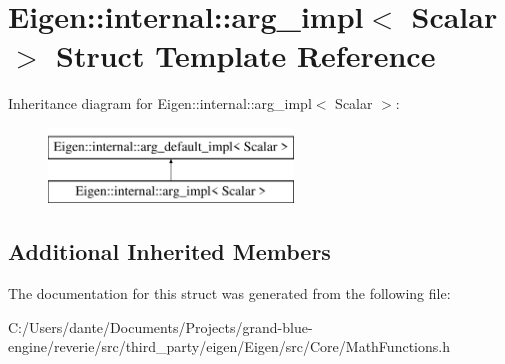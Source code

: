 \hypertarget{struct_eigen_1_1internal_1_1arg__impl}{}\section{Eigen\+::internal\+::arg\+\_\+impl$<$ Scalar $>$ Struct Template Reference}
\label{struct_eigen_1_1internal_1_1arg__impl}
Inheritance diagram for Eigen\+::internal\+::arg\+\_\+impl$<$ Scalar $>$\+:\begin{figure}[H]
\begin{center}
\leavevmode
\includegraphics[height=2.000000cm]{struct_eigen_1_1internal_1_1arg__impl}
\end{center}
\end{figure}
\subsection*{Additional Inherited Members}


The documentation for this struct was generated from the following file\+:\begin{DoxyCompactItemize}
\item 
C\+:/\+Users/dante/\+Documents/\+Projects/grand-\/blue-\/engine/reverie/src/third\+\_\+party/eigen/\+Eigen/src/\+Core/Math\+Functions.\+h\end{DoxyCompactItemize}
